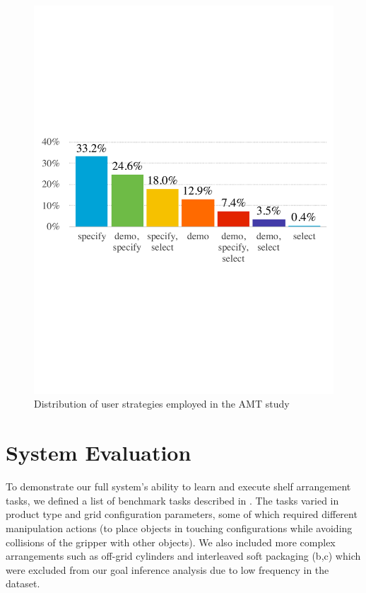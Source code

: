 \begin{figure}[h]
	\centering
	\includegraphics[width=0.7\linewidth]{figures/strategies}
	\caption{Distribution of user strategies employed in the AMT study}
	\label{fig:strategies}
\end{figure}



\section{System Evaluation}\label{sec:irossystemeval}

To demonstrate our full system's ability to learn and execute shelf arrangement tasks, we defined a list of benchmark tasks described in . 
The tasks varied in product type and grid configuration parameters, some of which required different manipulation actions (\eg to place objects in touching configurations while avoiding collisions of the gripper with other objects).
We also included more complex arrangements such as off-grid cylinders and interleaved soft packaging (b,c) which were excluded from our goal inference analysis due to low frequency in the dataset. 

